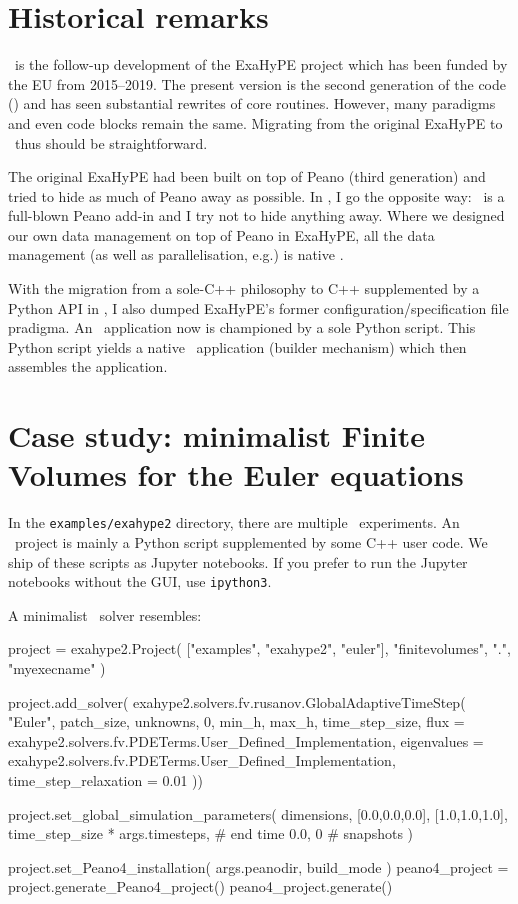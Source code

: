\section{Historical remarks}

\ExaHyPE\ is the follow-up development of the ExaHyPE project which has
been funded by the EU from 2015--2019.
The present version is the second generation of the code (\ExaHyPE) and has
seen substantial rewrites of core routines.
However, many paradigms and even code blocks remain the same.
Migrating from the original ExaHyPE to \ExaHyPE\ thus should be straightforward.


The original ExaHyPE had been built on top of Peano (third generation) and tried
to hide as much of Peano away as possible.
In \ExaHyPE, I go the opposite way: \ExaHyPE\ is a full-blown Peano add-in and I
try not to hide anything away.
Where we designed our own data management on top of Peano in ExaHyPE, all the
data management (as well as parallelisation, e.g.) is native \Peano.


With the migration from a sole-C++ philosophy to C++ supplemented by a Python
API in \Peano, I also dumped ExaHyPE's former configuration/specification file
pradigma.
An \ExaHyPE\ application now is championed by a sole Python script.
This Python script yields a native \Peano\ application (builder mechanism) which
then assembles the application.



\section{Case study: minimalist Finite Volumes for the Euler equations}
\label{section:exahype:fv}


\begin{remark}
 In the \texttt{examples/exahype2} directory, there are multiple \ExaHyPE\
 experiments. An \ExaHyPE\ project is mainly a Python script supplemented by
 some C++ user code. We ship of these scripts as Jupyter notebooks. If you prefer to run the Jupyter
 notebooks without the GUI, use \texttt{ipython3}.
\end{remark}


\noindent
A minimalist \ExaHyPE\ solver resembles:
\begin{code}
project = exahype2.Project( ["examples", "exahype2", "euler"], "finitevolumes", ".", "myexecname" )

project.add_solver(  exahype2.solvers.fv.rusanov.GlobalAdaptiveTimeStep(
  "Euler",
  patch_size,
  unknowns, 0,
  min_h, max_h,
  time_step_size,
  flux = exahype2.solvers.fv.PDETerms.User_Defined_Implementation,
  eigenvalues = exahype2.solvers.fv.PDETerms.User_Defined_Implementation,
  time_step_relaxation = 0.01
))

project.set_global_simulation_parameters(
  dimensions, [0.0,0.0,0.0], [1.0,1.0,1.0],
  time_step_size * args.timesteps, # end time
  0.0, 0                           # snapshots
)

project.set_Peano4_installation( args.peanodir, build_mode )
peano4_project = project.generate_Peano4_project()
peano4_project.generate()
\end{code}

